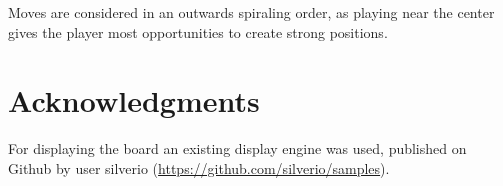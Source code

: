 \documentclass[11pt]{article}
\begin{document}


Moves are considered in an outwards spiraling order, as playing near the center gives the player most opportunities to create strong positions.

\section{Acknowledgments}
\label{-sec:acknowledgments}


For displaying the board an existing display engine was used, published on Github by user silverio (\url{https://github.com/silverio/samples}).

	\nocite{*}
	\printbibliography
\end{document}
